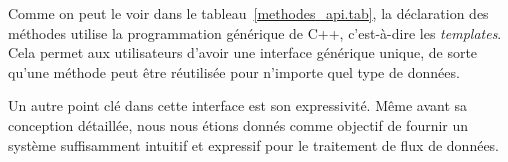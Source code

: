 %
%




Comme on peut le voir dans le tableau~\ref{methodes_api.tab}, la d\'eclaration des m\'ethodes utilise la programmation g\'en\'erique de C++, c'est-\`a-dire les \emph{templates}. Cela permet aux utilisateurs d'avoir une interface g\'en\'erique unique, de sorte qu'une m\'ethode peut \^etre r\'eutilis\'ee pour n'importe quel type de donn\'ees.


Un autre point cl\'e dans cette interface est son expressivit\'e. M\^eme avant sa conception d\'etaill\'ee, nous nous \'etions donn\'es comme objectif de fournir un syst\`eme suffisamment intuitif et expressif pour le traitement de flux de donn\'ees. 


